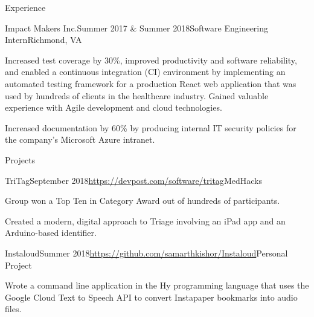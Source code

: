 \documentclass{resume}
\begin{document}
\begin{rSection}{Experience}
  \begin{rSubsection}{Impact Makers Inc.}{Summer 2017 \& Summer 2018}{Software Engineering Intern}{Richmond, VA}
    \item Increased test coverage by 30\%, improved productivity and software reliability, and enabled a continuous integration (CI) environment by implementing an automated testing framework for a production React web application that was used by hundreds of clients in the healthcare industry.  Gained valuable experience with Agile development and cloud technologies.
    \item Increased documentation by 60\% by producing internal IT security policies for the company's Microsoft Azure intranet.
  \end{rSubsection}

\end{rSection}

\begin{rSection}{Projects}

  \begin{rSubsection}{TriTag}{September 2018}{\url{https://devpost.com/software/tritag}}{MedHacks}
    \item Group won a Top Ten in Category Award out of hundreds of participants.
    \item Created a modern, digital approach to Triage involving an iPad app and an Arduino-based identifier.
  \end{rSubsection}

  \begin{rSubsection}{Instaloud}{Summer 2018}{\url{https://github.com/samarthkishor/Instaloud}}{Personal Project}
    \item Wrote a command line application in the Hy programming language that uses the Google Cloud Text to Speech API to convert Instapaper bookmarks into audio files.
  \end{rSubsection}

\end{rSection}
\end{document}

